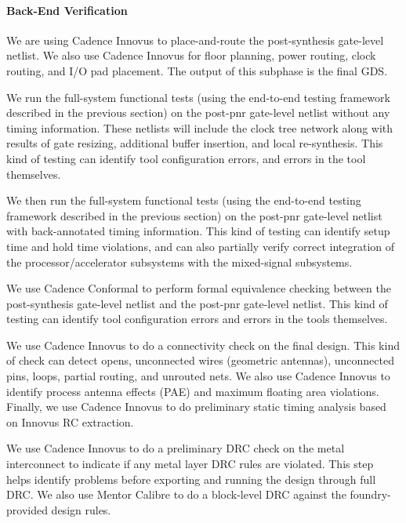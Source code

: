 \smallskip
\paragraph{Back-End Verification}
We are using Cadence Innovus to place-and-route the post-synthesis
gate-level netlist. We also use Cadence Innovus for floor planning, power
routing, clock routing, and I/O pad placement. The output of this
subphase is the final GDS.

\smallskip
\begin{cbxlist}{1.5em}{0em}{0.5em}

  \item {} We run the full-system
     functional tests (using the end-to-end testing framework described
     in the previous section) on the post-pnr gate-level netlist without
     any timing information. These netlists will include the clock tree
     network along with results of gate resizing, additional buffer
     insertion, and local re-synthesis. This kind of testing can identify
     tool configuration errors, and errors in the tool themselves.

  \item {} We then run the
     full-system functional tests (using the end-to-end testing framework
     described in the previous section) on the post-pnr gate-level
     netlist with back-annotated timing information. This kind of testing
     can identify setup time and hold time violations, and can also
     partially verify correct integration of the processor/accelerator
     subsystems with the mixed-signal subsystems.

  \item {} We use Cadence Conformal to
     perform formal equivalence checking between the post-synthesis
     gate-level netlist and the post-pnr gate-level netlist. This kind of
     testing can identify tool configuration errors and errors in the
     tools themselves.

  \item {} We use Cadence Innovus
     to do a connectivity check on the final design. This kind of check
     can detect opens, unconnected wires (geometric antennas),
     unconnected pins, loops, partial routing, and unrouted nets. We also
     use Cadence Innovus to identify process antenna effects (PAE) and
     maximum floating area violations. Finally, we use Cadence Innovus to
     do preliminary static timing analysis based on Innovus RC
     extraction.

  \item {} We use Cadence Innovus to do
     a preliminary DRC check on the metal interconnect to indicate if any
     metal layer DRC rules are violated. This step helps identify
     problems before exporting and running the design through full DRC.
     We also use Mentor Calibre to do a block-level DRC against the
     foundry-provided design rules.

\end{cbxlist}

